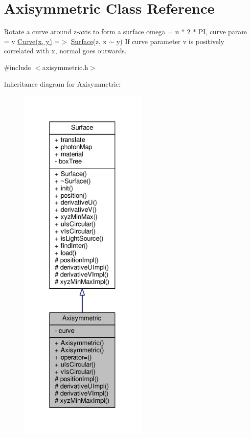 \hypertarget{classAxisymmetric}{}\section{Axisymmetric Class Reference}
\label{classAxisymmetric}


Rotate a curve around z-\/axis to form a surface omega = u $\ast$ 2 $\ast$ PI, curve param = v \hyperlink{classCurve}{Curve(x, y)} =$>$ \hyperlink{classSurface}{Surface}(z, x $\sim$ y) If curve parameter v is positively correlated with x, normal goes outwards.  




{\ttfamily \#include $<$axisymmetric.\+h$>$}



Inheritance diagram for Axisymmetric\+:\nopagebreak
\begin{figure}[H]
\begin{center}
\leavevmode
\includegraphics[width=180pt]{classAxisymmetric__inherit__graph}
\end{center}
\end{figure}


